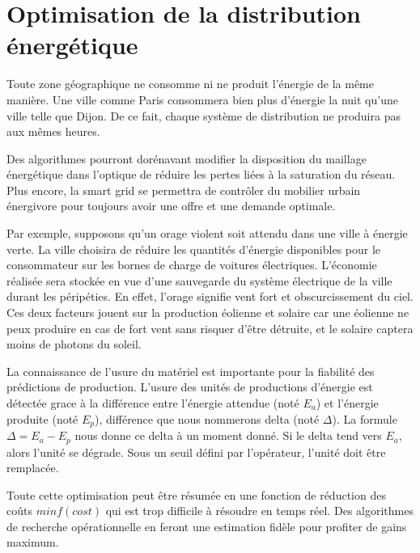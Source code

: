 \section{Optimisation de la distribution énergétique}

Toute zone géographique ne consomme ni ne produit l'énergie de la même manière.
Une ville comme Paris consommera bien plus d'énergie la nuit qu'une ville telle que Dijon.
De ce fait, chaque système de distribution ne produira pas aux mêmes heures.

Des algorithmes pourront dorénavant modifier la disposition du maillage énergétique dans l'optique
de réduire les pertes liées à la saturation du réseau. Plus encore, la smart grid se permettra de contrôler
du mobilier urbain énergivore pour toujours avoir une offre et une demande optimale.

Par exemple, supposons qu'un orage violent soit attendu dans une ville à énergie verte.
La ville choisira de réduire les quantités d'énergie disponibles pour le consommateur sur les bornes
de charge de voitures électriques.
L'économie réalisée sera stockée en vue d'une sauvegarde du système électrique de la ville durant les péripéties.
En effet, l'orage signifie vent fort et obscurcissement du ciel. Ces deux facteurs jouent sur la production
éolienne et solaire car une éolienne ne peux produire en cas de fort vent sans risquer d'être détruite, et le solaire
captera moins de photons du soleil.

La connaissance de l'usure du matériel est importante pour la fiabilité des prédictions de production.
L'usure des unités de productions d'énergie est détectée grace à la différence entre l'énergie attendue
(noté $E_a$) et l'énergie produite (noté $E_p$), différence que nous nommerons delta (noté $\Delta$).
La formule $\Delta = E_a - E_p$ nous donne ce delta à un moment donné.
Si le delta tend vers $E_a$, alors l'unité se dégrade. Sous un seuil défini par l'opérateur,
l'unité doit être remplacée.

Toute cette optimisation peut être résumée en une fonction de réduction des coûts $min f(cost)$ qui est trop difficile
à résoudre en temps réel. Des algorithmes de recherche opérationnelle en feront une estimation fidèle
pour profiter de gains maximum.


